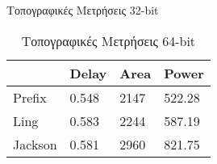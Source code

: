 \begin{multicols}{2}
\begin{table}[H]
\caption{Τοπογραφικές Μετρήσεις 32-bit}
\label{topo_result_table_32}
\end{table}
\begin{table}[H]
\centering
     \begin{tabular}{||p{1.2cm} | p{0.7cm} p{1cm} p{1cm} ||} 
        \hline
         & Delay & Area & Power \\ [0.5ex] 
        \hline\hline
        Prefix & 0.548 & 2147 & 522.28 \\
        \hline
        Ling & 0.583 & 2244 & 587.19 \\
        \hline
        Jackson & 0.581 & 2960 & 821.75 \\
        \hline
    \end{tabular}
\caption{Τοπογραφικές Μετρήσεις 64-bit}
\label{topo_result_table_64}
\end{table}
\end{multicols}









